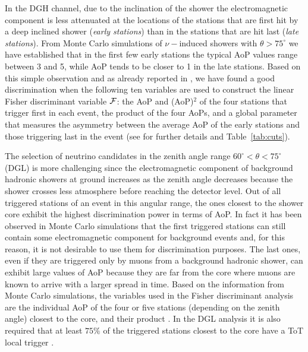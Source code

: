 \documentclass[reprint,showpacs,showkeys,amsmath,amssymb,aps,nofootinbib]{revtex4-1}
\begin{document}
In the DGH channel, due to the inclination of the shower the electromagnetic component 
is less attenuated at the locations of the stations that are first hit by a deep inclined shower
({\it early stations}) than in the stations that are hit last ({\it late stations}). From Monte Carlo 
simulations of $\nu-$induced showers with $\theta > 75^\circ$ we have established that in the first 
few early stations the typical AoP values range between 3 and 5, while AoP tends to be closer to 1 in 
the late stations. Based on this simple observation and as already reported in \cite{DGH},
we have found a good discrimination when the following ten variables are used to construct
the linear Fisher discriminant variable $\cal F$: the
AoP and (AoP)$^2$ of the four stations that trigger first in each event,
the product of the four AoPs, and a global parameter that
measures the asymmetry between the average AoP of the early
stations and those triggering last in the event 
(see \cite{DGH} for further details and Table~\ref{tab:cuts}).
 
The selection of neutrino candidates in the zenith angle range 
$60^\circ < \theta < 75^\circ$ (DGL) is more challenging since 
the electromagnetic component of background hadronic showers 
at ground increases as the zenith angle decreases because 
the shower crosses less atmosphere before reaching the detector level. 
Out of all triggered stations of an event in this angular 
range, the ones closest to the shower core exhibit the highest
discrimination power in terms of AoP. 
In fact it has been observed in Monte Carlo simulations that 
the first triggered stations can still contain some electromagnetic component 
for background events and, for this reason, it is not desirable to use them
for discrimination purposes. 
The last ones, even if they are triggered only by muons from a background
hadronic shower, can exhibit large values of AoP because they are far from 
the core where muons are known to arrive with a larger spread in time.
Based on the information from Monte Carlo simulations, 
the variables used in the Fisher discriminant analysis
are the individual AoP of the four or five stations (depending on the 
zenith angle) closest to the core, and their product \cite{DGL}.
In the DGL analysis it is also required that at least $75\%$ of the triggered stations 
closest to the core have a ToT local trigger \cite{DGL}.
\end{document}
